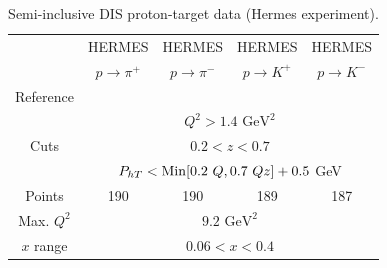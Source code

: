 \documentclass[aps,preprintnumbers,showpacs,nofootinbib,superscriptaddress,floatfix]{revtex4}
\newcommand{\Tperp}{T}
\begin{document}
\begin{table}[h!]
\begin{center}
\begin{tabular}{|c|c|c|c|c|}
 \hline
  & HERMES & HERMES & HERMES & HERMES \\
 ~          &  $p \to \pi^+$    &   $p \to \pi^-$    &  $p \to K^+$    &   $p \to K^-$               \\
 \hline
 Reference & \multicolumn{4}{c|}{\cite{Airapetian:2012ki}}        \\
\hline
\multirow{3}{*}{Cuts}             & \multicolumn{4}{c|}{$Q^2 > 1.4 \text{ GeV}^2$}     \\
             & \multicolumn{4}{c|}{$0.2 <z <0.7$}     \\
             & \multicolumn{4}{c|}{$P_{h \Tperp}< {\rm Min}[0.2\ Q, 0.7 \ Q z ] +0.5$ GeV}     \\
\hline
 Points         &  190 & 190 & 189 & 187       \\
 \hline
Max. $Q^2$      &  \multicolumn{4}{c|}{$9.2 \text{ GeV}^2 $}               \\
 \hline
$x$ range       & \multicolumn{4}{c|}{$0.06 < x < 0.4$ }                \\
\hline
\end{tabular}
\caption{Semi-inclusive DIS proton-target data (Hermes experiment).}
\label{t:data_SIDIS_proton}
\end{center}
\end{table}
\end{document}
